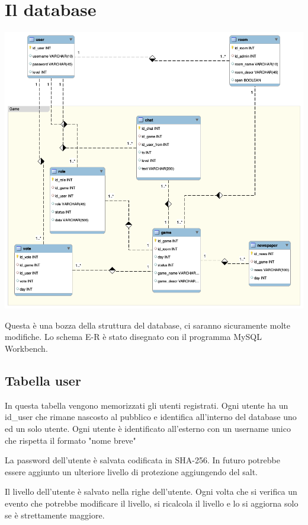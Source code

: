\documentclass[10pt,a4paper]{article}
\begin{document}
\newpage

\section{Il database}
\includegraphics[width = \textwidth]{database.png}

Questa è una bozza della struttura del database, ci saranno sicuramente molte modifiche. Lo schema E-R è stato disegnato con il programma \textsf{MySQL Workbench}.

\subsection{Tabella user}
In questa tabella vengono memorizzati gli utenti registrati. Ogni utente ha un \textsf{id\_user} che rimane nascosto al pubblico e identifica all'interno del database uno ed un solo utente. Ogni utente è identificato all'esterno con un \textsf{username} unico che rispetta il formato "nome breve"

La password dell'utente è salvata codificata in SHA-256. In futuro potrebbe essere aggiunto un ulteriore livello di protezione aggiungendo del salt.

Il livello dell'utente è salvato nella righe dell'utente. Ogni volta che si verifica un evento che potrebbe modificare il livello, si ricalcola il livello e lo si aggiorna solo se è strettamente maggiore.
\end{document}
